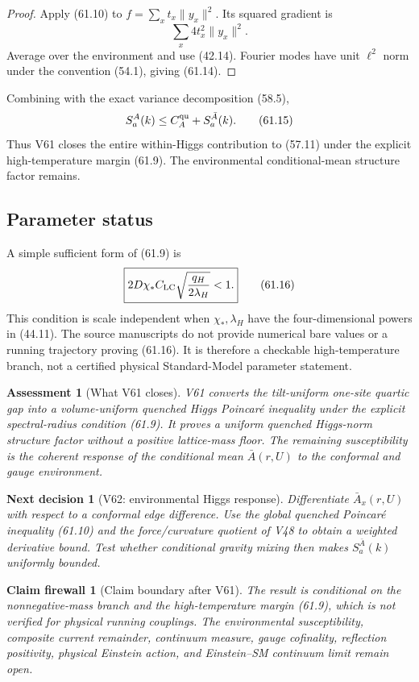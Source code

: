 \documentclass[11pt]{article}
\newtheorem{firewall}[theorem]{Claim firewall}
\newtheorem{decision}[theorem]{Next decision}
\newtheorem{assessment}[theorem]{Assessment}
\theoremstyle{remark}
\begin{document}
\begin{proof}
Apply (61.10) to \(f=\sum_xt_x\|y_x\|^2\).  Its squared gradient is
\[
 \sum_x4t_x^2\|y_x\|^2.
\]
Average over the environment and use (42.14).  Fourier modes have
unit \(\ell^2\) norm under the convention (54.1), giving (61.14).
\end{proof}

Combining with the exact variance decomposition (58.5),
\[
 S_a^A(k)
 \leq C_A^{\rm qu}+S_a^{\bar A}(k).               \tag{61.15}
\]
Thus V61 closes the entire within-Higgs contribution to (57.11) under
the explicit high-temperature margin (61.9).  The environmental
conditional-mean structure factor remains.

\subsection{Parameter status}

A simple sufficient form of (61.9) is
\[
\boxed{
 2D\chi_*C_{\rm LC}
 \sqrt{\frac{q_H}{2\lambda_H}}<1.}                \tag{61.16}
\]
This condition is scale independent when \(\chi_*,\lambda_H\) have
the four-dimensional powers in (44.11).  The source manuscripts do
not provide numerical bare values or a running trajectory proving
(61.16).  It is therefore a checkable high-temperature branch, not a
certified physical Standard-Model parameter statement.

\begin{assessment}[What V61 closes]
\label{ass:v17v61-status}
V61 converts the tilt-uniform one-site quartic gap into a
volume-uniform quenched Higgs Poincar\'e inequality under the explicit
spectral-radius condition (61.9).  It proves a uniform quenched
Higgs-norm structure factor without a positive lattice-mass floor.
The remaining susceptibility is the coherent response of the
conditional mean \(\bar A(r,U)\) to the conformal and gauge
environment.
\end{assessment}

\begin{decision}[V62: environmental Higgs response]
\label{dec:v17v61-next}
Differentiate \(\bar A_x(r,U)\) with respect to a conformal edge
difference.  Use the global quenched Poincar\'e inequality (61.10) and
the force/curvature quotient of V48 to obtain a weighted derivative
bound.  Test whether conditional gravity mixing then makes
\(S_a^{\bar A}(k)\) uniformly bounded.
\end{decision}

\begin{firewall}[Claim boundary after V61]
\label{fire:v17v61}
The result is conditional on the nonnegative-mass branch and the
high-temperature margin (61.9), which is not verified for physical
running couplings.  The environmental susceptibility, composite
current remainder, continuum measure, gauge cofinality, reflection
positivity, physical Einstein action, and Einstein--SM continuum limit
remain open.
\end{firewall}
\end{document}
